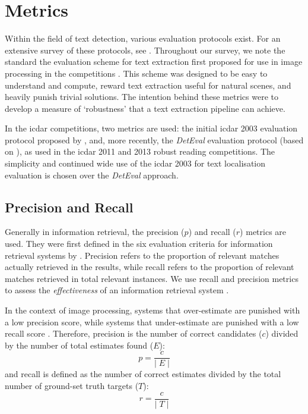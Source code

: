 \section{Metrics}
\label{sec:background:metrics}

Within the field of text detection, various evaluation protocols exist. For an extensive survey of these protocols, see \citep{Wolf:2006gv,Ye:2014bs}. Throughout our survey, we note the standard the evaluation scheme for text extraction first proposed for use in image processing in the  competitions \citep{Lucas:2003iw, Lucas:2005bq, Shahab:2011hq, Karatzas:2013by, Karatzas:2015tj}. This scheme was designed to be easy to understand and compute, reward text extraction useful for natural scenes, and heavily punish trivial solutions. The intention behind these metrics were to develop a measure of `robustness' that a text extraction pipeline can achieve. 

In the \gls{icdar} competitions, two metrics are used: the initial \gls{icdar} 2003 evaluation protocol proposed by \citet{Lucas:2003iw}, and, more recently, the \textit{DetEval} evaluation protocol \citep{Shivakumara:2011dn} (based on \citep{Wolf:2006gv}), as used in the \gls{icdar} 2011 and 2013 robust reading competitions. The simplicity and continued wide use of the \gls{icdar} 2003 for text localisation evaluation is chosen over the \textit{DetEval} approach.

\subsection{Precision and Recall}
\label{sec:background:metrics:precision_and_recall}

Generally in information retrieval, the precision ($p$) and recall ($r$) metrics are used. They were first defined in the six evaluation criteria for information retrieval systems by \citet{Cleverdon:1966vd}. Precision refers to the proportion of relevant matches actually retrieved in the results, while recall refers to the proportion of relevant matches retrieved in total relevant instances. We use recall and precision metrics to assess the \textit{effectiveness} of an information retrieval system \citep{Rijsbergen:1979dw}.

In the context of image processing, systems that over-estimate are punished with a low precision score, while systems that under-estimate are punished with a low recall score \citep{Lucas:2003iw}. Therefore, precision is the number of correct candidates ($c$) divided by the number of total estimates found ($E$):
\begin{equation*}
  p = \frac{c}{\lvert\;E\;\rvert}
\end{equation*}
and recall is defined as the number of correct estimates divided by the total number of ground-set truth targets ($T$):
\begin{equation*}
  r = \frac{c}{\lvert\;T\;\rvert}
\end{equation*}

